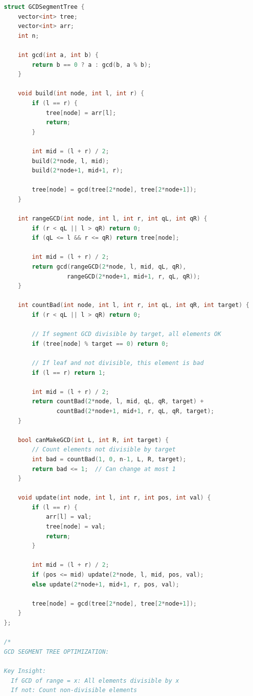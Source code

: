 \documentclass[11pt,a4paper,oneside]{book}
\begin{document}
\begin{lstlisting}[language=C++, caption=10+ COMPLETE DETAILED SOLUTIONS]
struct GCDSegmentTree {
    vector<int> tree;
    vector<int> arr;
    int n;
    
    int gcd(int a, int b) {
        return b == 0 ? a : gcd(b, a % b);
    }
    
    void build(int node, int l, int r) {
        if (l == r) {
            tree[node] = arr[l];
            return;
        }
        
        int mid = (l + r) / 2;
        build(2*node, l, mid);
        build(2*node+1, mid+1, r);
        
        tree[node] = gcd(tree[2*node], tree[2*node+1]);
    }
    
    int rangeGCD(int node, int l, int r, int qL, int qR) {
        if (r < qL || l > qR) return 0;
        if (qL <= l && r <= qR) return tree[node];
        
        int mid = (l + r) / 2;
        return gcd(rangeGCD(2*node, l, mid, qL, qR),
                  rangeGCD(2*node+1, mid+1, r, qL, qR));
    }
    
    int countBad(int node, int l, int r, int qL, int qR, int target) {
        if (r < qL || l > qR) return 0;
        
        // If segment GCD divisible by target, all elements OK
        if (tree[node] % target == 0) return 0;
        
        // If leaf and not divisible, this element is bad
        if (l == r) return 1;
        
        int mid = (l + r) / 2;
        return countBad(2*node, l, mid, qL, qR, target) +
               countBad(2*node+1, mid+1, r, qL, qR, target);
    }
    
    bool canMakeGCD(int L, int R, int target) {
        // Count elements not divisible by target
        int bad = countBad(1, 0, n-1, L, R, target);
        return bad <= 1;  // Can change at most 1
    }
    
    void update(int node, int l, int r, int pos, int val) {
        if (l == r) {
            arr[l] = val;
            tree[node] = val;
            return;
        }
        
        int mid = (l + r) / 2;
        if (pos <= mid) update(2*node, l, mid, pos, val);
        else update(2*node+1, mid+1, r, pos, val);
        
        tree[node] = gcd(tree[2*node], tree[2*node+1]);
    }
};

/*
GCD SEGMENT TREE OPTIMIZATION:

Key Insight:
  If GCD of range = x: All elements divisible by x
  If not: Count non-divisible elements
  

\end{lstlisting}
\end{document}
